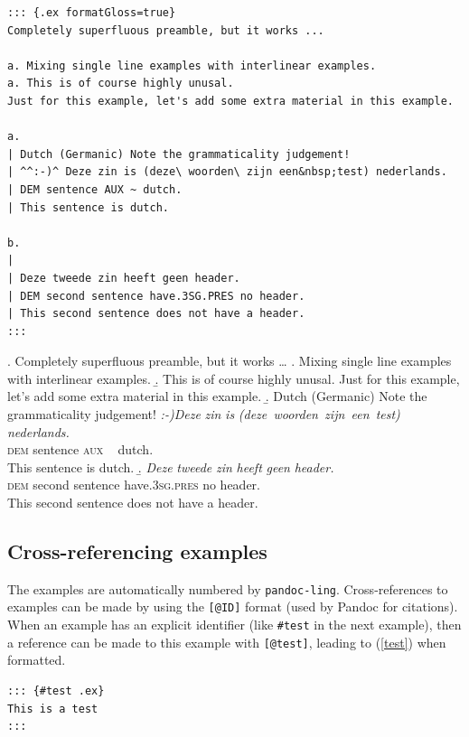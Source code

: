 \documentclass[
]{article}
\begin{document}
\begin{verbatim}
::: {.ex formatGloss=true}
Completely superfluous preamble, but it works ...

a. Mixing single line examples with interlinear examples.
a. This is of course highly unusal.
Just for this example, let's add some extra material in this example.

a.
| Dutch (Germanic) Note the grammaticality judgement!
| ^^:-)^ Deze zin is (deze\ woorden\ zijn een&nbsp;test) nederlands.
| DEM sentence AUX ~ dutch.
| This sentence is dutch.

b.
|
| Deze tweede zin heeft geen header.
| DEM second sentence have.3SG.PRES no header.
| This second sentence does not have a header.
:::
\end{verbatim}

\ex. \label{ling-ex:4.10} Completely superfluous preamble, but it works
\ldots{}
  \a. Mixing single line examples with interlinear examples.
  \b. This is of course highly unusal. Just for this example, let's add
some extra material in this example.
  \b.  Dutch (Germanic) Note the grammaticality judgement!
  \gll \emph{:-)}\emph{Deze} \emph{zin} \emph{is}
\emph{(deze~woorden~zijn~een~test)} \emph{nederlands.}\\
       \textsc{dem} sentence \textsc{aux}  ~  dutch.\\
  \glt This sentence is dutch.
  \b.  
  \gll \emph{Deze} \emph{tweede} \emph{zin} \emph{heeft} \emph{geen}
\emph{header.}\\
       \textsc{dem} second sentence have.\textsc{3sg}.\textsc{pres} no header.\\
  \glt This second sentence does not have a header.

\hypertarget{cross-referencing-examples}{%
\subsection{Cross-referencing
examples}\label{cross-referencing-examples}}

The examples are automatically numbered by \texttt{pandoc-ling}.
Cross-references to examples can be made by using the \texttt{{[}@ID{]}}
format (used by Pandoc for citations). When an example has an explicit
identifier (like \texttt{\#test} in the next example), then a reference
can be made to this example with \texttt{{[}@test{]}}, leading to
(\ref{test}) when formatted.

\begin{verbatim}
::: {#test .ex}
This is a test
:::
\end{verbatim}
\end{document}
